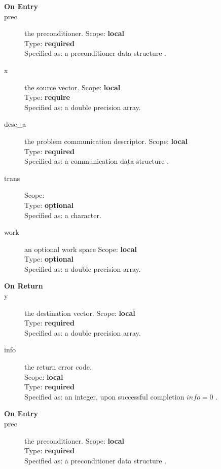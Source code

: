 \begin{description}
\item[\bf On Entry]
\item[prec] the preconditioner.
Scope: {\bf local} \\
Type: {\bf required}\\
Specified as: a preconditioner data structure \precdata.
\item[x] the source vector.
Scope: {\bf local} \\
Type: {\bf require}\\
Specified as: a double precision array.
\item[desc\_a] the problem communication descriptor.
Scope: {\bf local} \\
Type: {\bf required}\\
Specified as: a communication data structure \descdata.
\item[trans] 
Scope: {\bf } \\
Type: {\bf optional}\\
Specified as: a character.
\item[work] an optional work space
Scope: {\bf local} \\
Type: {\bf optional}\\
Specified as: a double precision array.
\end{description}

\begin{description}
\item[\bf On Return]
\item[y] the destination vector.
Scope: {\bf local} \\
Type: {\bf required}\\
Specified as: a double precision array.
\item[info] the return error code.\\
Scope: {\bf local} \\
Type: {\bf required}\\
Specified as: an integer, upon successful completion $info=0$ .\\
\end{description}





\begin{description}
\item[\bf On Entry]
\item[prec] the preconditioner.
Scope: {\bf local} \\
Type: {\bf required}\\
Specified as: a preconditioner data structure \precdata.
\end{description}



